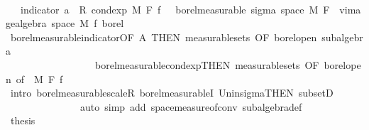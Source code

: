 \begin{isabellebody}
\ \ \ \ \ \ \ \ \isamarkupfalse%
\ {\isacharminus}{\kern0pt}\isanewline
\ \ \ \ \ \ \ \ \ \ \isamarkupfalse%
\ {\isacharasterisk}{\kern0pt}{\isacharcolon}{\kern0pt}\ {\isachardoublequoteopen}{\isacharparenleft}{\kern0pt}{\isasymlambda}{\isasymomega}{\isachardot}{\kern0pt}\ indicator\ a\ {\isasymomega}\ {\isacharasterisk}{\kern0pt}\isactrlsub R\ cond{\isacharunderscore}{\kern0pt}exp\ M\ F\ f\ {\isasymomega}{\isacharparenright}{\kern0pt}\ {\isasymin}\ borel{\isacharunderscore}{\kern0pt}measurable\ {\isacharparenleft}{\kern0pt}sigma\ {\isacharparenleft}{\kern0pt}space\ M{\isacharparenright}{\kern0pt}\ {\isacharparenleft}{\kern0pt}F\ {\isasymunion}\ vimage{\isacharunderscore}{\kern0pt}algebra\ {\isacharparenleft}{\kern0pt}space\ M{\isacharparenright}{\kern0pt}\ f\ borel{\isacharparenright}{\kern0pt}{\isacharparenright}{\kern0pt}{\isachardoublequoteclose}\isanewline
\ \ \ \ \ \ \ \ \ \ \ \ \isamarkupfalse%
\ borel{\isacharunderscore}{\kern0pt}measurable{\isacharunderscore}{\kern0pt}indicator{\isacharbrackleft}{\kern0pt}OF\ A{\isacharparenleft}{\kern0pt}{}{\isacharparenright}{\kern0pt}{\isacharcomma}{\kern0pt}\ THEN\ measurable{\isacharunderscore}{\kern0pt}sets{\isacharcomma}{\kern0pt}\ OF\ borel{\isacharunderscore}{\kern0pt}open{\isacharbrackright}{\kern0pt}\ subalgebra\ \isanewline
\ \ \ \ \ \ \ \ \ \ \ \ \ \ \ \ \ \ borel{\isacharunderscore}{\kern0pt}measurable{\isacharunderscore}{\kern0pt}cond{\isacharunderscore}{\kern0pt}exp{\isacharbrackleft}{\kern0pt}THEN\ measurable{\isacharunderscore}{\kern0pt}sets{\isacharcomma}{\kern0pt}\ OF\ borel{\isacharunderscore}{\kern0pt}open{\isacharcomma}{\kern0pt}\ of\ {\isacharunderscore}{\kern0pt}\ M\ F\ f{\isacharbrackright}{\kern0pt}\isanewline
\ \ \ \ \ \ \ \ \ \ \ \ \isamarkupfalse%
\ {\isacharparenleft}{\kern0pt}intro\ borel{\isacharunderscore}{\kern0pt}measurable{\isacharunderscore}{\kern0pt}scaleR\ borel{\isacharunderscore}{\kern0pt}measurableI\ Un{\isacharunderscore}{\kern0pt}in{\isacharunderscore}{\kern0pt}sigma{\isacharbrackleft}{\kern0pt}THEN\ subsetD{\isacharbrackright}{\kern0pt}{\isacharparenright}{\kern0pt}\isanewline
\ \ \ \ \ \ \ \ \ \ \ \ \ \ \ {\isacharparenleft}{\kern0pt}auto\ simp\ add{\isacharcolon}{\kern0pt}\ space{\isacharunderscore}{\kern0pt}measure{\isacharunderscore}{\kern0pt}of{\isacharunderscore}{\kern0pt}conv\ subalgebra{\isacharunderscore}{\kern0pt}def{\isacharparenright}{\kern0pt}\isanewline
\ \ \ \ \ \ \ \ \ \ \isamarkupfalse%
\ {\isacharquery}{\kern0pt}thesis\ \isamarkupfalse%

\end{isabellebody}
